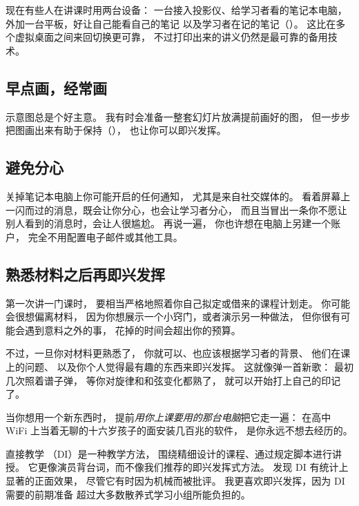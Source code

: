 现在有些人在讲课时用两台设备：
一台接入投影仪、给学习者看的笔记本电脑，
外加一台平板，好让自己能看自己的笔记
以及学习者在记的笔记（）。
这比在多个虚拟桌面之间来回切换更可靠，
不过打印出来的讲义仍然是最可靠的备用技术。

\subsection*{早点画，经常画}

示意图总是个好主意。
我有时会准备一整套幻灯片放满提前画好的图，
但一步步把图画出来有助于保持（），
也让你可以即兴发挥。

\subsection*{避免分心}

关掉笔记本电脑上你可能开启的任何通知，
尤其是来自社交媒体的。
看着屏幕上一闪而过的消息，既会让你分心，也会让学习者分心，
而且当冒出一条你不愿让别人看到的消息时，会让人很尴尬。
再说一遍，
你也许想在电脑上另建一个账户，
完全不用配置电子邮件或其他工具。

\subsection*{熟悉材料之后再即兴发挥}

第一次讲一门课时，
要相当严格地照着你自己拟定或借来的课程计划走。
你可能会很想偏离材料，
因为你想展示一个小窍门，或者演示另一种做法，
但你很有可能会遇到意料之外的事，
花掉的时间会超出你的预算。

不过，一旦你对材料更熟悉了，
你就可以、也应该根据学习者的背景、
他们在课上的问题、
以及你个人觉得最有趣的东西来即兴发挥。
这就像弹一首新歌：
最初几次照着谱子弹，
等你对旋律和和弦变化都熟了，
就可以开始打上自己的印记了。

当你想用一个新东西时，
提前\emph{用你上课要用的那台电脑}把它走一遍：
在高中 WiFi 上当着无聊的十六岁孩子的面安装几百兆的软件，
是你永远不想去经历的。

\begin{aside}{直接教学}
  （DI）是一种教学方法，
  围绕精细设计的课程、通过规定脚本进行讲授。
  它更像演员背台词，而不像我们推荐的即兴发挥式方法。
  \cite{Stoc2018}发现 DI 有统计上显著的正面效果，
  尽管它有时因为机械而被批评。
  我更喜欢即兴发挥，因为 DI 需要的前期准备
  超过大多数散养式学习小组所能负担的。
\end{aside}


